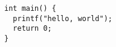 \documentclass[a4paper]{article}
\begin{document}
\begin{verbatim}
int main() {
  printf("hello, world");
  return 0;
}
\end{verbatim}
\end{document}
